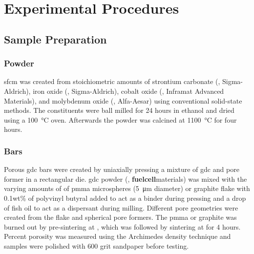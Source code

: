 


\chapter{Experimental Procedures}

\section{Sample Preparation}

    \subsection{ Powder}
        \gls{sfcm} was created from stoichiometric amounts of strontium carbonate (, Sigma-Aldrich), iron oxide (, Sigma-Aldrich), cobalt oxide (, Inframat Advanced Materials), and molybdenum oxide (, Alfa-Aesar) using conventional solid-state methods.
        The constituents were ball milled for 24 hours in ethanol and dried using a \SI{100}{\celsius} oven.
        Afterwards the powder was calcined at \SI{1100}{\celsius} for four hours.

    \subsection{Bars}
        Porous \gls{gdc} bars were created by uniaxially pressing a mixture of \gls{gdc} and pore former in a rectangular die.
        \Gls{gdc} powder (, \textbf{fuelcell}materials) was mixed with the varying amounts of of \gls{pmma} microspheres (\SI{5}{\micro\meter} diameter) or graphite flake with 0.1wt\% of polyvinyl butyral added to act as a binder during pressing and a drop of fish oil to act as a dispersant during milling.
        Different pore geometries were created from the flake and spherical pore formers.
        The \gls{pmma} or graphite was burned out by pre-sintering at , which was followed by sintering at  for 4 hours.
        Percent porosity was measured using the Archimedes density technique and samples were polished with 600 grit sandpaper before testing.

